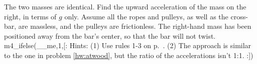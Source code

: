 The two masses are identical.
Find the upward acceleration of the mass on the right, in terms of $g$ only.
Assume all the ropes and
pulleys, as well as the cross-bar, are massless, and the pulleys are frictionless.
The right-hand mass has been positioned away from the bar's center, so that the
bar will not twist.
m4_ifelse(__me,1,[:%
Hints: (1) Use rules 1-3 on p.~\pageref{pulley-rules}.
(2) The approach is similar to the one in problem \ref{hw:atwood},
but the ratio of the accelerations isn't 1:1.\answercheck
:])
